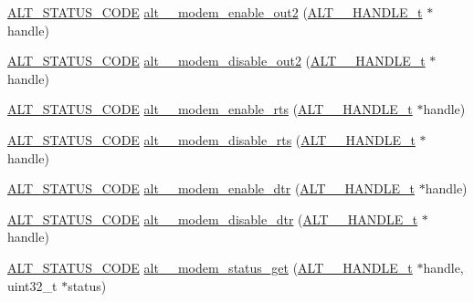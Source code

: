\begin{DoxyCompactItemize}
\item 
\mbox{\hyperlink{hwlib_8h_abdb0d369f069723ca55d6c94bcaaaa12}{A\+L\+T\+\_\+\+S\+T\+A\+T\+U\+S\+\_\+\+C\+O\+DE}} \mbox{\hyperlink{group__UART__MODEM_gaa526f06ccac0ca4f272ead0b8affaaa5}{alt\+\_\+\_\+modem\+\_\+enable\+\_\+out2}} (\mbox{\hyperlink{group__UART__BASIC_ga4173f362f19fc04032c3859b78d78119}{A\+L\+T\+\_\+\_\+\+H\+A\+N\+D\+L\+E\+\_\+t}} $\ast$handle)
\item 
\mbox{\hyperlink{hwlib_8h_abdb0d369f069723ca55d6c94bcaaaa12}{A\+L\+T\+\_\+\+S\+T\+A\+T\+U\+S\+\_\+\+C\+O\+DE}} \mbox{\hyperlink{group__UART__MODEM_ga407ab9e7eb979eedaf74d09c76602ca4}{alt\+\_\+\_\+modem\+\_\+disable\+\_\+out2}} (\mbox{\hyperlink{group__UART__BASIC_ga4173f362f19fc04032c3859b78d78119}{A\+L\+T\+\_\+\_\+\+H\+A\+N\+D\+L\+E\+\_\+t}} $\ast$handle)
\item 
\mbox{\hyperlink{hwlib_8h_abdb0d369f069723ca55d6c94bcaaaa12}{A\+L\+T\+\_\+\+S\+T\+A\+T\+U\+S\+\_\+\+C\+O\+DE}} \mbox{\hyperlink{group__UART__MODEM_gaf0526c0f515477dfa32e34f4e712ab61}{alt\+\_\+\_\+modem\+\_\+enable\+\_\+rts}} (\mbox{\hyperlink{group__UART__BASIC_ga4173f362f19fc04032c3859b78d78119}{A\+L\+T\+\_\+\_\+\+H\+A\+N\+D\+L\+E\+\_\+t}} $\ast$handle)
\item 
\mbox{\hyperlink{hwlib_8h_abdb0d369f069723ca55d6c94bcaaaa12}{A\+L\+T\+\_\+\+S\+T\+A\+T\+U\+S\+\_\+\+C\+O\+DE}} \mbox{\hyperlink{group__UART__MODEM_gaee57e9c1fd3a950e0ee38ed8e6a43306}{alt\+\_\+\_\+modem\+\_\+disable\+\_\+rts}} (\mbox{\hyperlink{group__UART__BASIC_ga4173f362f19fc04032c3859b78d78119}{A\+L\+T\+\_\+\_\+\+H\+A\+N\+D\+L\+E\+\_\+t}} $\ast$handle)
\item 
\mbox{\hyperlink{hwlib_8h_abdb0d369f069723ca55d6c94bcaaaa12}{A\+L\+T\+\_\+\+S\+T\+A\+T\+U\+S\+\_\+\+C\+O\+DE}} \mbox{\hyperlink{group__UART__MODEM_gaad66f3bac9da6aaa132f80870446f792}{alt\+\_\+\_\+modem\+\_\+enable\+\_\+dtr}} (\mbox{\hyperlink{group__UART__BASIC_ga4173f362f19fc04032c3859b78d78119}{A\+L\+T\+\_\+\_\+\+H\+A\+N\+D\+L\+E\+\_\+t}} $\ast$handle)
\item 
\mbox{\hyperlink{hwlib_8h_abdb0d369f069723ca55d6c94bcaaaa12}{A\+L\+T\+\_\+\+S\+T\+A\+T\+U\+S\+\_\+\+C\+O\+DE}} \mbox{\hyperlink{group__UART__MODEM_gadc0d324ab6b1f91e11338c7b6367ac4d}{alt\+\_\+\_\+modem\+\_\+disable\+\_\+dtr}} (\mbox{\hyperlink{group__UART__BASIC_ga4173f362f19fc04032c3859b78d78119}{A\+L\+T\+\_\+\_\+\+H\+A\+N\+D\+L\+E\+\_\+t}} $\ast$handle)
\item 
\mbox{\hyperlink{hwlib_8h_abdb0d369f069723ca55d6c94bcaaaa12}{A\+L\+T\+\_\+\+S\+T\+A\+T\+U\+S\+\_\+\+C\+O\+DE}} \mbox{\hyperlink{group__UART__MODEM_gaf74723b502d6c286c04f948ef002d5cd}{alt\+\_\+\_\+modem\+\_\+status\+\_\+get}} (\mbox{\hyperlink{group__UART__BASIC_ga4173f362f19fc04032c3859b78d78119}{A\+L\+T\+\_\+\_\+\+H\+A\+N\+D\+L\+E\+\_\+t}} $\ast$handle, uint32\+\_\+t $\ast$status)
\end{DoxyCompactItemize}


